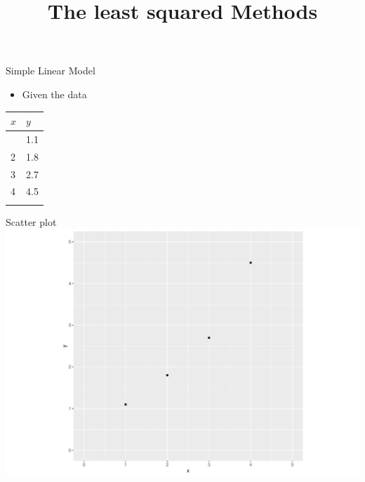 \documentclass[
  ignorenonframetext,
]{beamer}
\title{The least squared Methods}
\author{}
\date{}
\providecommand{\tightlist}{%
  \setlength{\itemsep}{0pt}\setlength{\parskip}{0pt}}\usepackage{longtable,booktabs,array}
\begin{document}
\frame{\titlepage}
\ifdefined\Shaded\renewenvironment{Shaded}{\begin{tcolorbox}[frame hidden, breakable, sharp corners, enhanced, borderline west={3pt}{0pt}{shadecolor}, interior hidden, boxrule=0pt]}{\end{tcolorbox}}\fi

\begin{frame}{Simple Linear Model}
\protect\hypertarget{simple-linear-model}{}
\begin{itemize}
\tightlist
\item
  Given the data
\end{itemize}

\begin{longtable}[]{@{}ll@{}}
\toprule\noalign{}
\(x\) & \(y\) \\
\midrule\noalign{}
\endhead
1 & 1.1 \\
2 & 1.8 \\
3 & 2.7 \\
4 & 4.5 \\
\bottomrule\noalign{}
\end{longtable}
\end{frame}

\begin{frame}{Scatter plot}
\protect\hypertarget{scatter-plot}{}
\includegraphics{1_files/figure-beamer/unnamed-chunk-2-1.pdf}
\end{frame}
\end{document}
